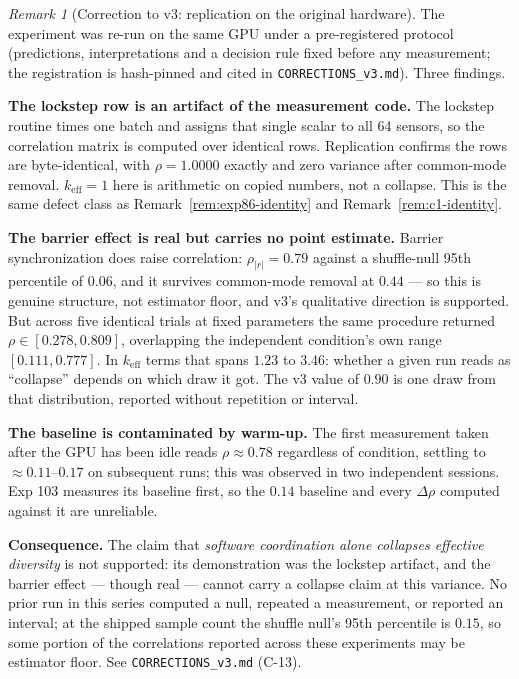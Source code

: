 \documentclass[11pt,a4paper]{article}
\theoremstyle{definition}
\theoremstyle{remark}
\newtheorem{remark}{Remark}[section]
\newcommand{\keff}{k_{\text{eff}}}
\begin{document}
\begin{remark}[Correction to v3: replication on the original hardware]
\label{rem:exp103-replication}
The experiment was re-run on the same GPU under a pre-registered protocol (predictions,
interpretations and a decision rule fixed before any measurement; the registration is
hash-pinned and cited in \texttt{CORRECTIONS\_v3.md}). Three findings.

\textbf{The lockstep row is an artifact of the measurement code.} The lockstep routine times
one batch and assigns that single scalar to all 64 sensors, so the correlation matrix is
computed over identical rows. Replication confirms the rows are byte-identical, with
$\rho = 1.0000$ exactly and zero variance after common-mode removal. $\keff = 1$ here is
arithmetic on copied numbers, not a collapse. This is the same defect class as
Remark~\ref{rem:exp86-identity} and Remark~\ref{rem:c1-identity}.

\textbf{The barrier effect is real but carries no point estimate.} Barrier synchronization does
raise correlation: $\rho_{|r|} = 0.79$ against a shuffle-null 95th percentile of $0.06$, and it
survives common-mode removal at $0.44$ --- so this is genuine structure, not estimator floor,
and v3's qualitative direction is supported. But across five identical trials at fixed
parameters the same procedure returned $\rho \in [0.278, 0.809]$, overlapping the independent
condition's own range $[0.111, 0.777]$. In $\keff$ terms that spans $1.23$ to $3.46$: whether a
given run reads as ``collapse'' depends on which draw it got. The v3 value of $0.90$ is one
draw from that distribution, reported without repetition or interval.

\textbf{The baseline is contaminated by warm-up.} The first measurement taken after the GPU
has been idle reads $\rho \approx 0.78$ regardless of condition, settling to $\approx 0.11$--$0.17$
on subsequent runs; this was observed in two independent sessions. Exp 103 measures its
baseline first, so the $0.14$ baseline and every $\Delta\rho$ computed against it are unreliable.

\textbf{Consequence.} The claim that \emph{software coordination alone collapses effective
diversity} is not supported: its demonstration was the lockstep artifact, and the barrier
effect --- though real --- cannot carry a collapse claim at this variance. No prior run in this
series computed a null, repeated a measurement, or reported an interval; at the shipped sample
count the shuffle null's 95th percentile is $0.15$, so some portion of the correlations reported
across these experiments may be estimator floor. See \texttt{CORRECTIONS\_v3.md} (C-13).
\end{remark}
\end{document}
